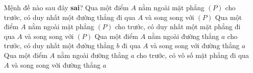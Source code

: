 \begin{ex}%
	Mệnh đề nào sau đây \textbf{sai}?
	\choice
	{\True Qua một điểm $A$ nằm ngoài mặt phẳng $(P)$ cho trước, có duy nhất một đường thẳng đi qua $A$ và song song với $(P)$} 
	{ Qua một điểm $A$ nằm ngoài mặt phẳng $(P)$ cho trước, có duy nhất một mặt phẳng đi qua $A$ và song song với $(P)$} 
	{ Qua một điểm $A$ nằm ngoài đường thẳng $a$ cho trước, có duy nhất một đường thẳng $b$ đi qua $A$ và song song với đường thẳng $a$} 
	{ Qua một điểm $A$ nằm ngoài đường thẳng $a$ cho trước, có vô số mặt phẳng đi qua $A$ và song song với đường thẳng $a$}
\end{ex} 

